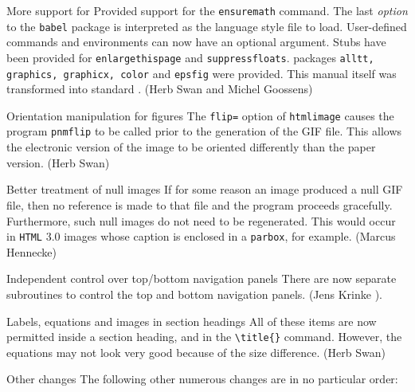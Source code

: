 \begin{htmllist}
\item[More support for \LaTeXe] Provided support for the
\texttt{ensuremath} command.  The last \emph{option} to the \texttt{babel}
package is interpreted as the \latextohtml{} language style file to load.
User-defined commands and environments can now have an optional
argument.  Stubs have been provided for \texttt{enlargethispage}
and \texttt{suppressfloats}.  \LaTeXe packages \texttt{alltt,
graphics, graphicx, color} and \texttt{epsfig} were
provided.  This manual itself was transformed into standard
\LaTeXe.  (Herb Swan and Michel Goossens)

\item[Orientation manipulation for figures] The \texttt{flip=}
option of \texttt{htmlimage} causes the program \texttt{pnmflip} to
be called prior to the generation of the GIF file.  This allows
the electronic version of the image to be oriented differently
than the paper version.  (Herb Swan)

\item[Better treatment of null images]  If for some reason an
image produced a null GIF file, then no reference is made to that
file and the program proceeds gracefully.  Furthermore, such null
images do not need to be regenerated.  This would occur
in \texttt{HTML} 3.0 images whose caption is enclosed in a \texttt{parbox},
for example.  (Marcus Hennecke)

\item[Independent control over top/bottom navigation panels]
There are now separate subroutines to control the top and bottom
navigation panels.  (Jens Krinke ).

\item[Labels, equations and images in section headings]
All of these items are now permitted inside a section heading,
and in the \verb|\title{}| command.
However, the equations may not look very good because of the size
difference.  (Herb Swan)

\item[Other changes] The following other numerous changes are
in no particular order:


\end{htmllist}
